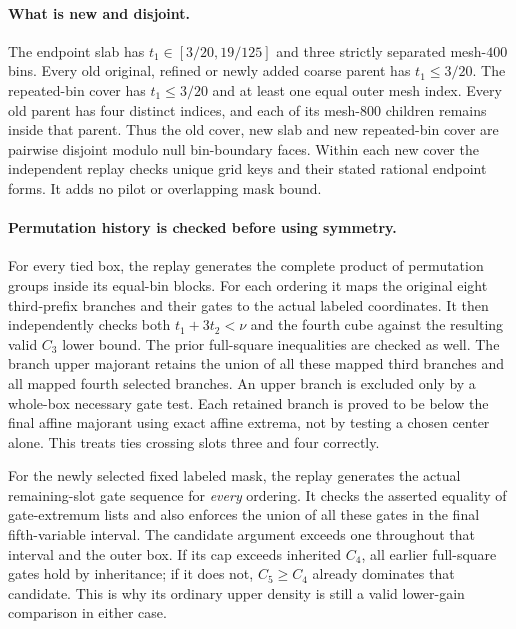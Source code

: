 \paragraph{What is new and disjoint.}
The endpoint slab has $t_1\in[3/20,19/125]$ and three strictly
separated mesh-$400$ bins.  Every old original, refined or newly added
coarse parent has $t_1\le3/20$.  The repeated-bin cover has
$t_1\le3/20$ and at least one equal outer mesh index.  Every old parent
has four distinct indices, and each of its mesh-$800$ children remains
inside that parent.  Thus the old cover, new slab and new repeated-bin
cover are pairwise disjoint modulo null bin-boundary faces.  Within
each new cover the independent replay checks unique grid keys and
their stated rational endpoint forms.  It adds no pilot or overlapping
mask bound.

\paragraph{Permutation history is checked before using symmetry.}
For every tied box, the replay generates the complete product of
permutation groups inside its equal-bin blocks.  For each ordering it
maps the original eight third-prefix branches and their gates to the
actual labeled coordinates.  It then independently checks both
$t_1+3t_2<\nu$ and the fourth cube against the resulting valid
$C_3$ lower bound.  The prior full-square inequalities are checked
as well.  The branch upper majorant retains the union of all these
mapped third branches and all mapped fourth selected branches.  An
upper branch is excluded only by a whole-box necessary gate test.
Each retained branch is proved to be below the final affine majorant
using exact affine extrema, not by testing a chosen center alone.
This treats ties crossing slots three and four correctly.

For the newly selected fixed labeled mask, the replay generates the
actual remaining-slot gate sequence for \emph{every} ordering.  It
checks the asserted equality of gate-extremum lists and also enforces
the union of all these gates in the final fifth-variable interval.
The candidate argument exceeds one throughout that interval and the
outer box.  If its cap exceeds inherited $C_4$, all earlier full-square
gates hold by inheritance; if it does not, $C_5\ge C_4$ already
dominates that candidate.  This is why its ordinary upper density is
still a valid lower-gain comparison in either case.

